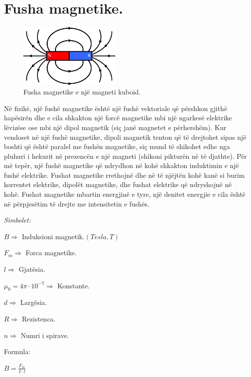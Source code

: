 \documentclass[twocolumn]{article}
\begin{document}
	\section{Fusha magnetike.}
	\begin{figure}[h]
		\includegraphics[width=50mm]{Imazhet/fusha_magnetike.png}
		\caption{Fusha magnetike e një magneti kuboid.}
		\label{fig:boat1}
	\end{figure}
	Në fizikë, një fushë magnetike është një fushë vektoriale që përshkon gjithë hapësirën dhe e cila shkakton një forcë magnetike mbi një ngarkesë elektrike lëvizëse ose mbi një dipol magnetik (siç janë magnetet e përhershëm). Kur vendoset në një fushë magnetike, dipoli magnetik tenton që të drejtohet sipas një boshti që është paralel me fushën magnetike, siç mund të shikohet edhe nga pluhuri i hekurit në prezencën e një magneti (shikoni pikturën në të djathte). Për më tepër, një fushë magnetike që ndrydhon në kohë shkakton induktimin e një fushë elektrike. Fushat magnetike rrethojnë dhe në të njëjtën kohë kanë si burim korrentet elektrike, dipolët magnetike, dhe fushat elektrike që ndryshojnë në kohë. Fushat magnetike mbartin energjinë e tyre, një denitet energjie e cila është në përpjesëtim të drejte me intensitetin e fushës.
	
	\begin{center}
		\textit{Simbolet:}
	\end{center}
	
	$B \Rightarrow $ Induksioni magnetik.$(Tesla,T)$
	
	$F_m \Rightarrow$ Forca magnetike.
	
	$l \Rightarrow$ Gjatësia.
	
	$\mu_0 = 4\pi \cdot 10^{-7} \Rightarrow $ Konstante.
	
	$d \Rightarrow $ Largësia.
	
	$R \Rightarrow$ Rezistenca.
	
	$n \Rightarrow $ Numri i spirave.
	
	\begin{center}
		Formula:
	\end{center}
	
	$B=\frac{F_m}{I \cdot l}$
	
\end{document}
